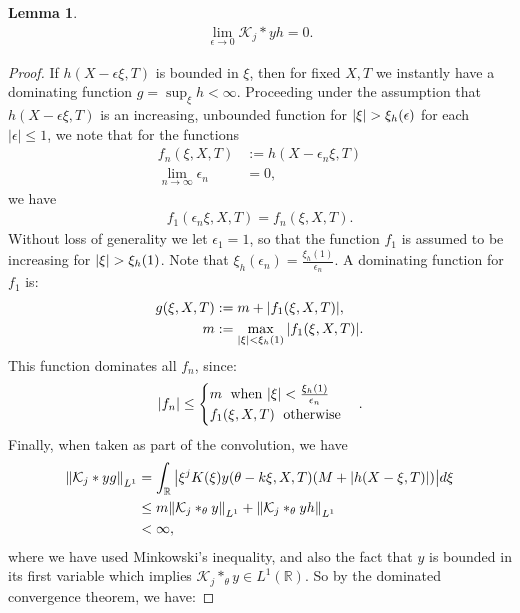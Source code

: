 \documentclass[11pt,leqno]{article}
\numberwithin{equation}{section}
\newcommand{\R}{\mathbb R}
\newtheorem{lemma}[theorem]{Lemma}
\theoremstyle{definition}
\begin{document}
\begin{appendices}
\begin{lemma}
\begin{align*}
			\lim_{\epsilon \rightarrow 0}\mathcal{K}_{j}*yh = 0.
		\end{align*}
	\end{lemma}
	\begin{proof}
		If $ h(X-\epsilon\xi,T) $ is bounded in $ \xi $, then for fixed $ X,T $ we instantly have a dominating function $ g = \sup_{\xi}h < \infty $. Proceeding under the assumption that $ h(X-\epsilon\xi,T) $ is an increasing, unbounded function for $ \abs{\xi} > \xi_{h}(\epsilon) $ for each $ |\epsilon| \leq 1 $, we note that for the functions
		\begin{align*}
			f_{n}(\xi,X,T) &:=h(X-\epsilon_{n}\xi,T)\\
			\lim_{n\rightarrow \infty}\epsilon_{n} &= 0,
		\end{align*}
		we have
		\begin{align*}
			f_{1}(\epsilon_{n}\xi,X,T) = f_{n}(\xi,X,T).
		\end{align*}
		Without loss of generality we let $ \epsilon_{1} = 1 $, so that the function $ f_{1} $ is assumed to be increasing for $ \abs{\xi} > \xi_{h}(1) $. Note that $ \xi_{h}(\epsilon_{n}) = \frac{\xi_{h}(1)}{\epsilon_{n}} $. A dominating function for $ f_{1} $ is:
		\begin{align*}
			g(\xi,X,T) &:= m + \abs{f_{1}(\xi,X,T)},\\
			m &:= \max_{\abs{\xi} < \xi_{h}(1)}\abs{f_{1}(\xi,X,T)}.
		\end{align*}
		This function dominates all $ f_{n} $, since:
		\begin{align*}
			\abs{f_{n}} \leq \begin{cases}
				m \text{\; when $ \abs{\xi} <  \frac{\xi_{h}(1)}{\epsilon_{n}}$}\\
				f_{1}(\xi,X,T) \text{\; otherwise}
			\end{cases}.
		\end{align*}
		Finally, when taken as part of the convolution, we have
		\begin{align*}
			\norm{\mathcal{K}_{j}*yg}_{L^{1}} &= \int_{\R}\abs{\xi^{j}K(\xi)y(\theta - k\xi,X,T)(M + \abs{h(X-\xi,T)})}d\xi\\
			&\leq m\norm{\mathcal{K}_{j}*_{\theta}y}_{L^{1}} + \norm{\mathcal{K}_{j}*_{\theta}yh}_{L^{1}}\\
			&< \infty,
		\end{align*}
		where we have used Minkowski's inequality, and also the fact that $ y $ is bounded in its first variable which implies $ \mathcal{K}_{j}*_{\theta}y \in L^{1}(\R) $. So by the dominated convergence theorem, we have:

\end{proof}
\end{appendices}
\end{document}
